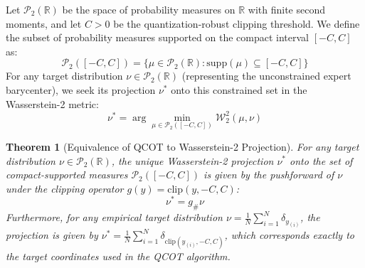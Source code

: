 \documentclass{article}
\theoremstyle{plain}
\newtheorem{theorem}{Theorem}[section]
\theoremstyle{definition}
\theoremstyle{remark}
\begin{document}
Let $\mathcal{P}_2(\mathbb{R})$ be the space of probability measures on $\mathbb{R}$ with finite second moments, and let $C > 0$ be the quantization-robust clipping threshold. We define the subset of probability measures supported on the compact interval $[-C, C]$ as:
\begin{equation}
    \mathcal{P}_2([-C, C]) = \{ \mu \in \mathcal{P}_2(\mathbb{R}) : \text{supp}(\mu) \subseteq [-C, C] \}
\end{equation}
For any target distribution $\nu \in \mathcal{P}_2(\mathbb{R})$ (representing the unconstrained expert barycenter), we seek its projection $\nu^*$ onto this constrained set in the Wasserstein-2 metric:
\begin{equation}
    \nu^* = \arg\min_{\mu \in \mathcal{P}_2([-C, C])} \mathcal{W}_2^2(\mu, \nu)
\end{equation}

\begin{theorem}[Equivalence of QCOT to Wasserstein-2 Projection]
For any target distribution $\nu \in \mathcal{P}_2(\mathbb{R})$, the unique Wasserstein-2 projection $\nu^*$ onto the set of compact-supported measures $\mathcal{P}_2([-C, C])$ is given by the pushforward of $\nu$ under the clipping operator $g(y) = \text{clip}(y, -C, C)$:
\begin{equation}
    \nu^* = g_{\#} \nu
\end{equation}
Furthermore, for any empirical target distribution $\nu = \frac{1}{N} \sum_{i=1}^N \delta_{y_{(i)}}$, the projection is given by $\nu^* = \frac{1}{N} \sum_{i=1}^N \delta_{\text{clip}(y_{(i)}, -C, C)}$, which corresponds exactly to the target coordinates used in the QCOT algorithm.
\label{thm:equivalence_projection}
\end{theorem}
\end{document}
